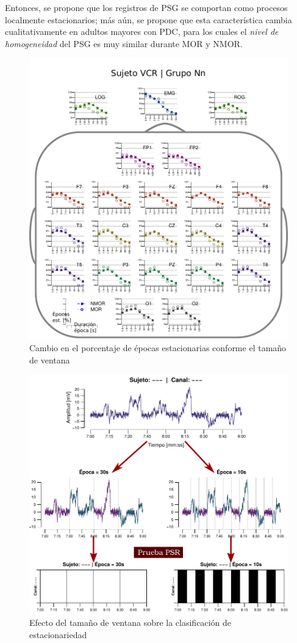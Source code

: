 Entonces, se propone que los registros de PSG se comportan como procesos localmente estacionarios; 
más aún, se propone que esta característica cambia cualitativamente en adultos mayores con PDC,
para los cuales el \textit{nivel de homogeneidad} del PSG es muy similar durante MOR y NMOR.

\begin{figure}
\centering
\includegraphics[width=.9\linewidth]{./img_resultados/cabeza_VCR.pdf}
\caption{Cambio en el porcentaje de épocas estacionarias conforme el tamaño de ventana}
\label{cabeza_repoio}
\end{figure}

\begin{figure}
\centering
\includegraphics[width=\linewidth]{./img_diagramas/epocas_diferentes_v2.pdf}
\caption{Efecto del tamaño de ventana sobre la clasificación de estacionariedad}
\label{epocas_diferentes}
\end{figure}

